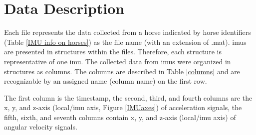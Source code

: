\section{Data Description}
\label{sec:datadesc}


Each file represents the data collected from a horse indicated by horse identifiers (Table \ref{IMU info on horses}) as the file name (with an extension of .mat). \gls{imu}s are presented in structures within the files. Therefore, each structure is representative of one \gls{imu}. The collected data from \gls{imu}s were organized in structures as columns. The columns are described in Table \ref{columns} and are recognizable by an assigned name (column name) on the first row. 
  


The first column is the timestamp, the second, third, and fourth columns are the x, y, and z-axis (local/\gls{imu} axis, Figure \ref{IMUaxes}) of acceleration signals, the fifth, sixth, and seventh columns contain x, y, and z-axis (local/\gls{imu} axis) of angular velocity signals. 